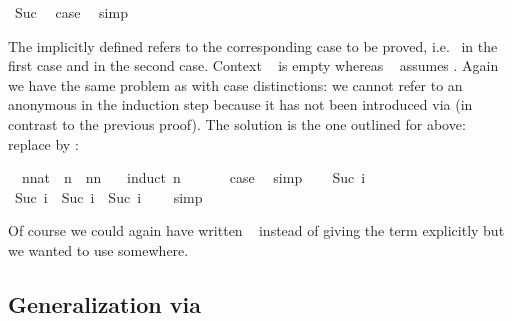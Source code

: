 \begin{isabellebody}
\ Suc\ \isamarkupfalse%
\ {\isacharquery}case\ \isamarkupfalse%
\ simp\isanewline
{}\isamarkupfalse%
%
\endisatagproof
{\isafoldproof}%
%
\isadelimproof
%
\endisadelimproof
%
\begin{isamarkuptext}%
\noindent The implicitly defined  refers to the
corresponding case to be proved, i.e.\  in the first case and
 in the second case. Context ~ is
empty whereas ~ assumes . Again we
have the same problem as with case distinctions: we cannot refer to an anonymous 
in the induction step because it has not been introduced via 
(in contrast to the previous proof). The solution is the one outlined for
 above: replace  by :%
\end{isamarkuptext}%
\isamarkuptrue%
\isamarkupfalse%
\ \ n{\isacharcolon}{\isacharcolon}nat\ \ {\isachardoublequoteopen}n\ {\isacharless}\ n{\isacharasterisk}n\ {\isacharplus}\ {}{\isachardoublequoteclose}\isanewline
%
\isadelimproof
%
\endisadelimproof
%
\isatagproof
{}\isamarkupfalse%
\ {\isacharparenleft}induct\ n{\isacharparenright}\isanewline
\ \ \isamarkupfalse%
\ {}\ \isamarkupfalse%
\ {\isacharquery}case\ \isamarkupfalse%
\ simp\isanewline
{}\isamarkupfalse%
\isanewline
\ \ \isamarkupfalse%
\ {\isacharparenleft}Suc\ i{\isacharparenright}\ \isamarkupfalse%
\ {\isachardoublequoteopen}Suc\ i\ {\isacharless}\ Suc\ i\ {\isacharasterisk}\ Suc\ i\ {\isacharplus}\ {}{\isachardoublequoteclose}\ \isamarkupfalse%
\ simp\isanewline
{}\isamarkupfalse%
%
\endisatagproof
{\isafoldproof}%
%
\isadelimproof
%
\endisadelimproof
%
\begin{isamarkuptext}%
\noindent Of course we could again have written
~ instead of giving the term explicitly
but we wanted to use  somewhere.

\subsection{Generalization via }


\end{isamarkuptext}
\end{isabellebody}
